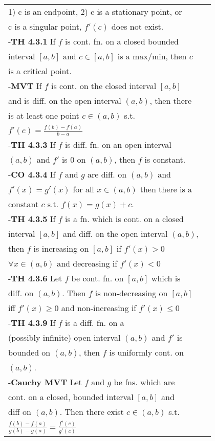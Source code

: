 \documentclass[10 pt,landscape]{article}
\begin{document}
\begin{multicols}{4}
\begin{tabular}{@{}ll@{}}
1) c is an endpoint, 2) c is a stationary point, or\\ c is a singular point, $f'(c)$ does not exist.\\
-\textbf{TH 4.3.1} If $f$ is cont. fn. on a closed bounded \\ interval $[a,b]$ and $c \in [a,b]$ is a max/min, then $c$ \\ is a critical point.\\
-\textbf{MVT} If $f$ is cont. on the closed interval $[a,b]$\\ and is diff. on the open interval $(a,b)$, then there \\is at least one point $c \in (a,b)$ s.t.\\ $f'(c)=\frac{f(b)-f(a)}{b-a}$\\
-\textbf{TH 4.3.3} If $f$ is diff. fn. on an open interval\\ $(a,b)$ and $f'$ is 0 on $(a,b)$, then $f$ is constant.\\
-\textbf{CO 4.3.4} If $f$ and $g$ are diff. on $(a,b)$ and \\ $f'(x)=g'(x)$ for all $x \in (a,b)$ then there is a \\ constant $c$ s.t. $f(x)=g(x)+c$.\\
-\textbf{TH 4.3.5} If $f$ is a fn. which is cont. on a closed\\
interval $[a,b]$ and diff. on the open interval $(a,b)$,\\ then $f$ is increasing on $[a,b]$ if $f'(x)>0 $\\ $\forall x \in (a,b)$ and decreasing if $f'(x)<0$\\
-\textbf{TH 4.3.6} Let $f$ be cont. fn. on $[a,b]$ which is \\
diff. on $(a,b)$. Then $f$ is non-decreasing on $[a,b]$ \\iff $f'(x)\geq 0$ and non-increasing if $f'(x)\leq 0$\\
-\textbf{TH 4.3.9} If $f$ is a diff. fn. on a\\ (possibly infinite) open interval $(a,b)$ and $f'$ is \\ bounded on $(a,b)$, then $f$ is uniformly  cont. on\\ $(a,b)$.\\
-\textbf{Cauchy MVT} Let $f$ and $g$ be fns. which are \\cont. on a closed, bounded interval $[a,b]$ and\\ diff on $(a,b)$. Then there exist $c \in (a,b)$ s.t. \\ $\frac{f(b)-f(a)}{g(b)-g(a)}=\frac{f'(c)}{g'(c)}$\\


\end{tabular}
\end{multicols}
\end{document}
